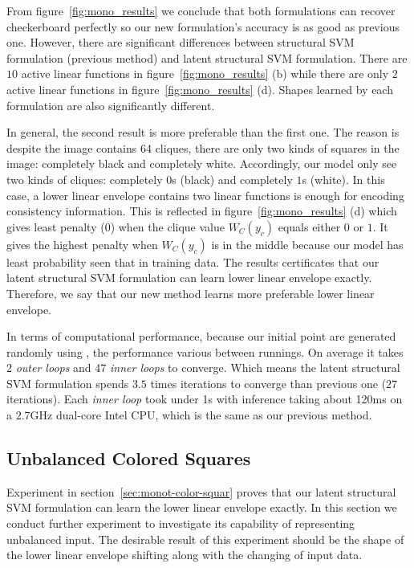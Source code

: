 From figure~\ref{fig:mono_results} we conclude that both
formulations can recover checkerboard perfectly so our new
formulation's accuracy is as good as previous one. However,
there are significant differences between structural SVM
formulation (previous method) and latent structural SVM
formulation. There are $10$ active linear functions in
figure~\ref{fig:mono_results} (b) while there are only $2$ active
linear functions in figure~\ref{fig:mono_results} (d). Shapes
learned by each formulation are also significantly different.

In general, the second result is more preferable than the first
one. The reason is despite the image contains 64 cliques, there
are only two kinds of squares in the image: completely black and
completely white. Accordingly, our model only see two kinds of
cliques: completely $0$s (black) and completely $1$s (white). In
this case, a lower linear envelope contains two linear functions
is enough for encoding consistency information. This is reflected
in figure~\ref{fig:mono_results} (d) which gives least penalty
(0) when the clique value $W_C(y_c)$ equals either $0$ or $1$. It
gives the highest penalty when $W_C(y_c)$ is in the middle
because our model has least probability seen that in training
data. The results certificates that our latent structural SVM
formulation can learn lower linear envelope exactly. Therefore,
we say that our new method learns more preferable lower linear
envelope.

In terms of computational performance, because our initial point
are generated randomly using , the
performance various between runnings. On average it takes 2
\emph{outer loops} and 47 \emph{inner loops} to converge. Which
means the latent structural SVM formulation spends $3.5$ times
iterations to converge than previous one ($27$ iterations).
Each \emph{inner loop} took under 1s with inference taking about
120ms on a $2.7$GHz dual-core Intel CPU, which is the same as our
previous method.



\subsection{Unbalanced Colored Squares}
\label{sec:unbal-color-squar}

Experiment in section~\ref{sec:monot-color-squar} proves that our
latent structural SVM formulation can learn the lower linear
envelope exactly. In this section we conduct further experiment
to investigate its capability of representing unbalanced input.
The desirable result of this experiment should be the shape of
the lower linear envelope shifting along with the changing of
input data.

